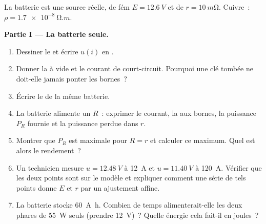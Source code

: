 \begin{problem}
\label{pb:b1:dc-circuits:1}
La batterie est une source réelle, de fém $E = \qty{12.6}{V}$ et de
 $r = \qty{10}{m\ohm}$. Cuivre~: $\rho = \qty{1.7e-8}{\ohm.m}$.

\medskip
\noindent\textbf{Partie I --- La batterie seule.}
\begin{enumerate}
  \item Dessiner le  et écrire $u(i)$ en .
  \item Donner la  à vide et le courant de court-circuit.
        Pourquoi une clé tombée ne doit-elle jamais ponter les bornes~?
  \item Écrire le  de la même batterie.
  \item La batterie alimente un  $R$~: exprimer le
        courant, la  aux bornes, la puissance $P_R$ fournie et la
        puissance perdue dans $r$.
  \item Montrer que $P_R$ est maximale pour $R = r$ et calculer ce
        maximum. Quel est alors le rendement~?
  \item Un technicien mesure $u = \qty{12.48}{V}$ à \qty{12}{A} et
        $u = \qty{11.40}{V}$ à \qty{120}{A}. Vérifier que les deux points
        sont sur le modèle et expliquer comment une série de tels points
        donne $E$ et $r$ par un ajustement affine.
  \item La batterie stocke \qty{60}{A.h}. Combien de temps
        alimenterait-elle les deux phares de \qty{55}{W} seuls (prendre
        \qty{12}{V})~? Quelle énergie cela fait-il en joules~?
\end{enumerate}


\end{problem}
